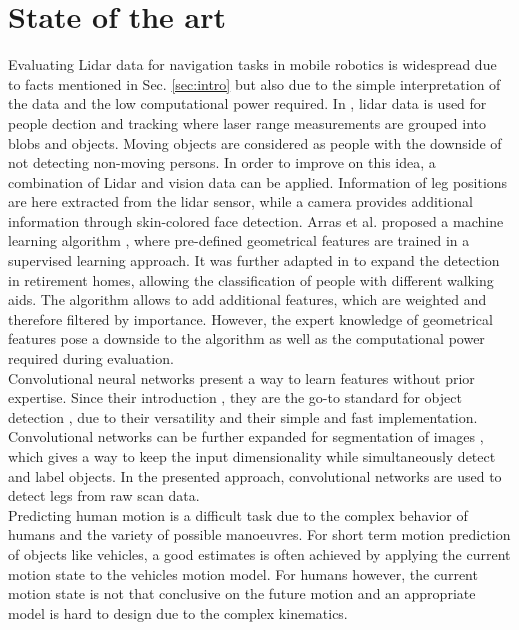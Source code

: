 \section{State of the art}
\label{sec:sota}

Evaluating Lidar data for navigation tasks in mobile robotics is widespread due to facts mentioned in Sec. \ref{sec:intro} but also due to the simple interpretation of the data and the low computational power required.
In \cite{1013691}, lidar data is used for people dection and tracking where laser range measurements are grouped into blobs and objects. 
Moving objects are considered as people with the downside of not detecting non-moving persons.
In order to improve on this idea, a combination of Lidar and vision data \cite{kleinehagenbrock2002person} can be applied. 
Information of leg positions are here extracted from the lidar sensor, while a camera provides additional information through skin-colored face detection. 
Arras et al. proposed a machine learning algorithm \cite{Arras07usingboosted}, where pre-defined geometrical features are trained in a supervised learning approach. 
It was further adapted in \cite{weinrich2014people} to expand the detection in retirement homes, allowing the classification of people with different walking aids. 
The algorithm allows to add additional features, which are weighted and therefore filtered by importance.
However, the expert knowledge of geometrical features pose a downside to the algorithm as well as the computational power required during evaluation.\\
Convolutional neural networks present a way to learn features without prior expertise. 
Since their introduction \cite{lecun_gradient-based_1998}, they are the go-to standard for object detection \cite{krizhevsky_imagenet_2012}, due to their versatility and their simple and fast implementation. 
Convolutional networks can be further expanded for segmentation of images \cite{long2015fully}, which gives a way to keep the input dimensionality while simultaneously detect and label objects.
In the presented approach, convolutional networks are used to detect legs from raw scan data.\\
Predicting human motion is a difficult task due to the complex behavior of humans and the variety of possible manoeuvres.
For short term motion prediction of objects like vehicles, a good estimates is often achieved by applying the current motion state to the vehicles motion model.
For humans however, the current motion state is not that conclusive on the future motion and an appropriate model is hard to design due to the complex kinematics. 
